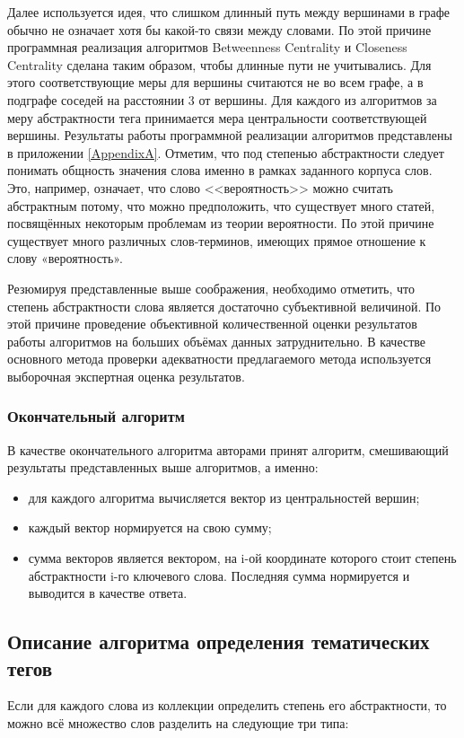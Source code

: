 Далее используется идея, что слишком длинный путь между вершинами в графе обычно не означает хотя бы какой-то связи между словами. По этой причине программная реализация алгоритмов Betweenness Centrality и Closeness Centrality сделана таким образом, чтобы длинные пути не учитывались. Для этого соответствующие меры для вершины считаются не во всем графе, а в подграфе соседей на расстоянии 3 от вершины. Для каждого из алгоритмов за меру абстрактности тега принимается мера центральности соответствующей вершины. Результаты работы программной реализации алгоритмов представлены в приложении \ref{AppendixA}. Отметим, что под степенью абстрактности следует понимать общность значения слова именно в рамках заданного корпуса слов. Это, например, означает, что слово <<вероятность>> можно считать абстрактным потому, что можно предположить, что существует много статей, посвящённых некоторым проблемам из теории вероятности. По этой причине существует много различных слов-терминов, имеющих прямое отношение к слову «вероятность».

Резюмируя представленные выше соображения, необходимо отметить, что степень абстрактности слова является достаточно субъективной величиной. По этой причине проведение объективной количественной оценки результатов работы алгоритмов на больших объёмах данных затруднительно. В качестве основного метода проверки адекватности предлагаемого метода используется выборочная экспертная оценка результатов.

\subsubsection{Окончательный алгоритм}

В качестве окончательного алгоритма авторами принят алгоритм, смешивающий
результаты представленных выше алгоритмов, а именно:

\begin{itemize}
    \item для каждого алгоритма вычисляется вектор из центральностей вершин;
    \item каждый вектор нормируется на свою сумму;
    \item сумма векторов является вектором, на i-ой координате которого стоит степень абстрактности i-го ключевого слова. Последняя сумма нормируется и выводится в качестве ответа.
\end{itemize}

\subsection{Описание алгоритма определения тематических тегов}
Если для каждого слова из коллекции определить степень его абстрактности, то можно всё
множество слов разделить на следующие три типа:


